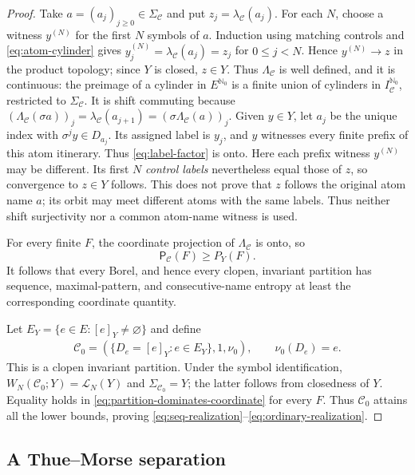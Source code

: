\documentclass[11pt,reqno]{amsart}
\numberwithin{equation}{section}
\theoremstyle{definition}
\newcommand{\Nzero}{\mathbb N_0}
\newcommand{\C}{\mathcal C}
\newcommand{\Lcal}{\mathcal L}
\newcommand{\Patt}{\mathsf P}
\begin{document}
\begin{proof}
Take $a=(a_j)_{j\ge0}\in\Sigma_\C$ and put $z_j=\lambda_\C(a_j)$.  For each
$N$, choose a witness $y^{(N)}$ for the first $N$ symbols of $a$.  Induction
using matching controls and \eqref{eq:atom-cylinder} gives
$y^{(N)}_j=\lambda_\C(a_j)=z_j$ for $0\le j<N$.  Hence
$y^{(N)}\to z$ in the product topology; since $Y$ is closed, $z\in Y$.  Thus
$\Lambda_\C$ is well defined, and it is continuous: the preimage of a cylinder in $E^{\Nzero}$ is a finite
union of cylinders in $I_\C^{\Nzero}$, restricted to $\Sigma_\C$.
It is shift commuting because
$(\Lambda_\C(\sigma a))_j=\lambda_\C(a_{j+1})
=(\sigma\Lambda_\C(a))_j$.  Given $y\in Y$, let $a_j$ be the unique index with
$\sigma^j y\in D_{a_j}$.  Its assigned label is $y_j$, and $y$ witnesses
every finite prefix of this atom itinerary.  Thus \eqref{eq:label-factor} is onto.  Here each prefix witness $y^{(N)}$ may be different. Its first $N$
\emph{control labels} nevertheless equal those of $z$, so convergence to
$z\in Y$ follows. This does not prove that $z$ follows the original atom
name $a$; its orbit may meet different atoms with the same labels.
Thus neither shift surjectivity nor a common atom-name witness is used.

For every finite $F$, the coordinate projection of $\Lambda_\C$ is onto, so
\begin{equation}\label{eq:partition-dominates-coordinate}
 \Patt_\C(F)\ge P_Y(F).
\end{equation}
It follows that every Borel, and hence every clopen, invariant partition has
sequence, maximal-pattern, and consecutive-name entropy at least the
corresponding coordinate quantity.

Let $E_Y=\{e\in E:[e]_Y\ne\varnothing\}$ and define
\begin{align*}
\C_0=(\{D_e=[e]_Y:e\in E_Y\},1,\nu_0),
 \qquad \nu_0(D_e)=e.
\end{align*}
This is a clopen invariant partition.  Under the symbol identification,
$W_N(\C_0;Y)=\Lcal_N(Y)$ and $\Sigma_{\C_0}=Y$; the latter follows from
closedness of $Y$.  Equality holds in \eqref{eq:partition-dominates-coordinate}
for every $F$.  Thus $\C_0$ attains all the lower bounds, proving
\eqref{eq:seq-realization}--\eqref{eq:ordinary-realization}.
\end{proof}


\subsection{A Thue--Morse separation}\label{sec:thue-morse}
\end{document}
